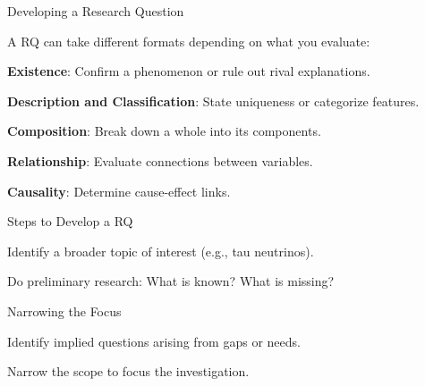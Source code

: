\begin{frame}{Developing a Research Question}
\begin{block}{}
\onslide<+-> A RQ can take different formats depending on what you evaluate:

\vspace{0.3cm}

\onslide<+-> \textbf{Existence}: Confirm a phenomenon or rule out rival explanations.

\vspace{0.3cm}

\onslide<+-> \textbf{Description and Classification}: State uniqueness or categorize features.

\vspace{0.3cm}

\onslide<+-> \textbf{Composition}: Break down a whole into its components.

\vspace{0.3cm}

\onslide<+-> \textbf{Relationship}: Evaluate connections between variables.

\vspace{0.3cm}

\onslide<+-> \textbf{Causality}: Determine cause-effect links.
\end{block}
\end{frame}

\begin{frame}{Steps to Develop a RQ}
\begin{block}{}
\onslide<+-> Identify a broader topic of interest (e.g., tau neutrinos).

\vspace{0.3cm}

\onslide<+-> Do preliminary research: What is known? What is missing?
\end{block}
\end{frame}

\begin{frame}{Narrowing the Focus}
\begin{block}{}
\onslide<+-> Identify implied questions arising from gaps or needs.

\vspace{0.3cm}

\onslide<+-> Narrow the scope to focus the investigation.
\end{block}
\end{frame}

